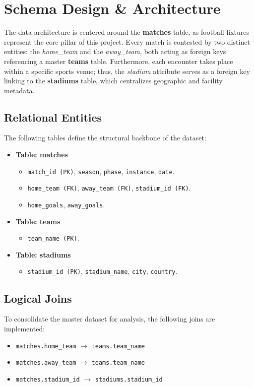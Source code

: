 \documentclass[12pt,a4paper]{article}
\begin{document}
\section{Schema Design \& Architecture}
The data architecture is centered around the \textbf{matches} table, as football fixtures represent the core pillar of this project. Every match is contested by two distinct entities: the \textit{home\_team} and the \textit{away\_team}, both acting as foreign keys referencing a master \textbf{teams} table. Furthermore, each encounter takes place within a specific sports venue; thus, the \textit{stadium} attribute serves as a foreign key linking to the \textbf{stadiums} table, which centralizes geographic and facility metadata.

\subsection{Relational Entities}
The following tables define the structural backbone of the dataset:
\begin{itemize}
    \item \textbf{Table: matches}
    \begin{itemize}
        \item \texttt{match\_id (PK)}, \texttt{season}, \texttt{phase}, \texttt{instance}, \texttt{date}.
        \item \texttt{home\_team (FK)}, \texttt{away\_team (FK)}, \texttt{stadium\_id (FK)}.
        \item \texttt{home\_goals}, \texttt{away\_goals}.
    \end{itemize}

    \item \textbf{Table: teams}
    \begin{itemize}
        \item \texttt{team\_name (PK)}.
    \end{itemize}

    \item \textbf{Table: stadiums}
    \begin{itemize}
        \item \texttt{stadium\_id (PK)}, \texttt{stadium\_name}, \texttt{city}, \texttt{country}.
    \end{itemize}
\end{itemize}

\subsection{Logical Joins}
To consolidate the master dataset for analysis, the following joins are implemented:
\begin{itemize}
    \item \texttt{matches.home\_team} $\rightarrow$ \texttt{teams.team\_name}
    \item \texttt{matches.away\_team} $\rightarrow$ \texttt{teams.team\_name}
    \item \texttt{matches.stadium\_id} $\rightarrow$ \texttt{stadiums.stadium\_id}
\end{itemize}
\end{document}

